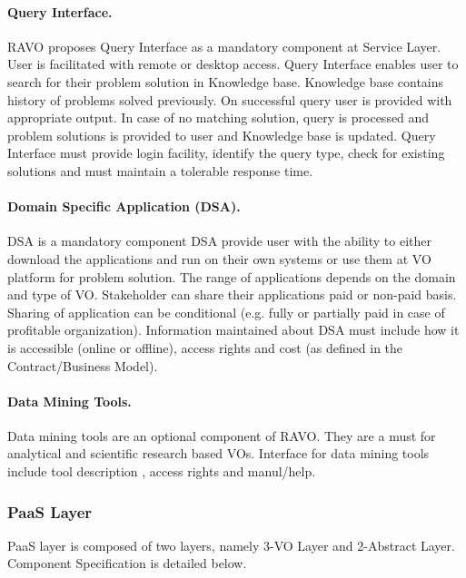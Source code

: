 \documentclass[]{article}
\begin{document}
\paragraph{Query Interface.}
RAVO proposes Query Interface as a mandatory component at Service Layer. User is facilitated with remote or desktop access. Query Interface enables user to search for their problem solution in Knowledge base. Knowledge base contains history of problems solved previously. On successful query user is provided with appropriate output. In case of no matching solution, query is processed and problem solutions is provided to user and Knowledge base is updated. Query Interface must provide login facility, identify the query type, check for existing solutions and must maintain a tolerable response time.



\paragraph{Domain Specific Application (DSA).}
DSA is a mandatory component DSA provide user with the ability to either download the applications and run on their own systems or use them at VO platform for problem solution. The range of applications depends on the domain and type of VO. Stakeholder can share their applications paid or non-paid basis. Sharing of application can be conditional (e.g. fully or partially paid in case of profitable organization). Information maintained about DSA must include how it is accessible (online or offline), access rights and cost (as defined in the Contract/Business Model).
\paragraph{Data Mining Tools.}
Data mining tools are an optional component of RAVO. They are a must for analytical and scientific research based VOs. Interface for data mining tools include tool description , access rights and  manul/help.

\subsubsection{PaaS Layer}
PaaS layer is composed of two layers, namely 3-VO Layer and 2-Abstract Layer. Component Specification is detailed below.
\end{document}
